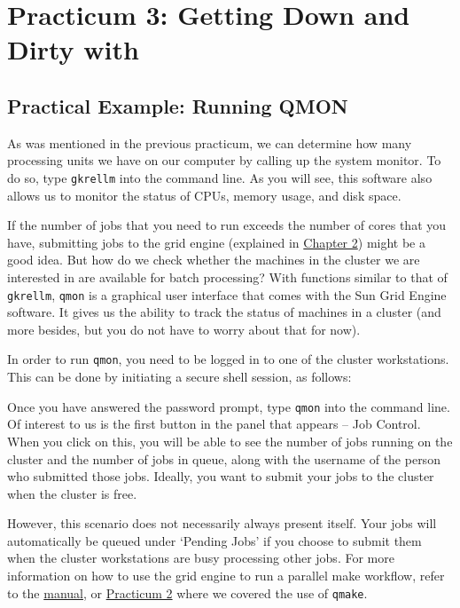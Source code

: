 \chapter*{Practicum 3: Getting Down and Dirty with \maken{}}

\section{Practical Example: Running QMON}

As was mentioned in the previous practicum, we can determine how many processing units we have on our computer by calling up the system monitor. To do so, type \texttt{gkrellm} into the command line. As you will see, this software also allows us to monitor the status of CPUs, memory usage, and disk space. 

If the number of jobs that you need to run exceeds the number of cores that you have, submitting jobs to the grid engine (explained in \hyperref[sec:gridengine]{Chapter 2}) might be a good idea. But how do we check whether the machines in the cluster we are interested in are available for batch processing? With functions similar to that of \texttt{gkrellm}, \texttt{qmon} is a graphical user interface that comes with the Sun Grid Engine software. It gives us the ability to track the status of machines in a cluster (and more besides, but you do not have to worry about that for now).  

In order to run \texttt{qmon}, you need to be logged in to one of the cluster workstations. This can be done by initiating a secure shell session, as follows:

Once you have answered the password prompt, type \texttt{qmon} into the command line. Of interest to us is the first button in the panel that appears -- Job Control. When you click on this, you will be able to see the number of jobs running on the cluster and the number of jobs in queue, along with the username of the person who submitted those jobs. Ideally, you want to submit your jobs to the cluster when the cluster is free. 

However, this scenario does not necessarily always present itself. Your jobs will automatically be queued under `Pending Jobs' if you choose to submit them when the cluster workstations are busy processing other jobs. For more information on how to use the grid engine to run a parallel make workflow, refer to the \hyperref[sec:gridengine]{manual}, or \hyperref[sec:practicum2]{Practicum 2} where we covered the use of \texttt{qmake}. 

